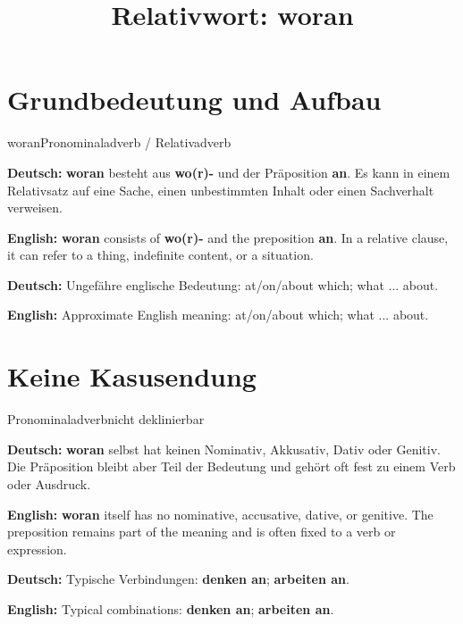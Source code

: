 \documentclass[a4paper,11pt]{article}
\title{Relativwort: \glqq woran\grqq{}}
\date{}
\newcommand{\GermanText}[1]{\textbf{Deutsch: }#1\par}
\newcommand{\EnglishText}[1]{{\small\color{SoftGray}\textbf{English: }#1\par}}
\begin{document}
\maketitle

\tableofcontents

\newpage

\section{Grundbedeutung und Aufbau}

\begin{grammarentry}{woran}{Pronominaladverb / Relativadverb}

\GermanText{\textbf{woran} besteht aus \textbf{wo(r)-} und der Präposition \textbf{an}. Es kann in einem Relativsatz auf eine Sache, einen unbestimmten Inhalt oder einen Sachverhalt verweisen.}

\EnglishText{\textbf{woran} consists of \textbf{wo(r)-} and the preposition \textbf{an}. In a relative clause, it can refer to a thing, indefinite content, or a situation.}

\GermanText{Ungefähre englische Bedeutung: \glqq at/on/about which; what ... about\grqq{}.}

\EnglishText{Approximate English meaning: \glqq at/on/about which; what ... about\grqq{}.}

\end{grammarentry}

\section{Keine Kasusendung}

\begin{grammarentry}{Pronominaladverb}{nicht deklinierbar}

\GermanText{\textbf{woran} selbst hat keinen Nominativ, Akkusativ, Dativ oder Genitiv. Die Präposition bleibt aber Teil der Bedeutung und gehört oft fest zu einem Verb oder Ausdruck.}

\EnglishText{\textbf{woran} itself has no nominative, accusative, dative, or genitive. The preposition remains part of the meaning and is often fixed to a verb or expression.}

\GermanText{Typische Verbindungen: \textbf{denken an}; \textbf{arbeiten an}.}

\EnglishText{Typical combinations: \textbf{denken an}; \textbf{arbeiten an}.}

\end{grammarentry}
\end{document}
